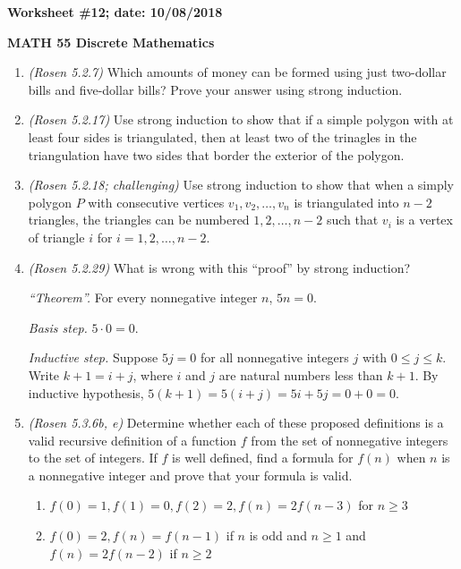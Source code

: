 \documentclass{article}
\begin{document}
{\bf Worksheet \#12; date: 10/08/2018}

{\bf MATH 55 Discrete Mathematics}

\begin{enumerate}
\item {\em (Rosen 5.2.7)} Which amounts of money can be formed using just two-dollar bills and five-dollar bills? Prove your answer using strong induction.

\item {\em (Rosen 5.2.17)} Use strong induction to show that if a simple polygon with at least four sides is triangulated, then at least two of the trinagles in the triangulation have two sides that border the exterior of the polygon.

\item {\em (Rosen 5.2.18; challenging)} Use strong induction to show that when a simply polygon $P$ with consecutive vertices $v_1, v_2, \ldots, v_n$ is triangulated into $n-2$ triangles, the triangles can be numbered $1, 2, \ldots, n-2$ such that $v_i$ is a vertex of triangle $i$ for $i = 1, 2, \ldots, n-2$.

\item {\em (Rosen 5.2.29)} What is wrong with this ``proof'' by strong induction?

{\em ``Theorem''.} For every nonnegative integer $n$, $5n = 0$.

{\em Basis step.} $5 \cdot 0 = 0$.

{\em Inductive step.} Suppose $5j = 0$ for all nonnegative integers $j$ with $0 \le j \le k$. Write $k+1 = i+j$, where $i$ and $j$ are natural numbers less than $k+1$. By inductive hypothesis, $5(k+1) = 5(i+j) = 5i + 5j = 0 + 0 = 0$.

\item {\em (Rosen 5.3.6b, e)} Determine whether each of these proposed definitions is a valid recursive definition of a function $f$ from the set of nonnegative integers to the set of integers. If $f$ is well defined, find a formula for $f(n)$ when $n$ is a nonnegative integer and prove that your formula is valid.
\begin{enumerate}
\item $f(0) = 1, f(1) = 0, f(2) = 2, f(n) = 2f(n-3)$ for $n \ge 3$
\item $f(0) = 2, f(n) = f(n-1)$ if $n$ is odd and $n \ge 1$ and $f(n) = 2f(n-2)$ if $n \ge 2$
\end{enumerate}
\end{enumerate}
\end{document}
